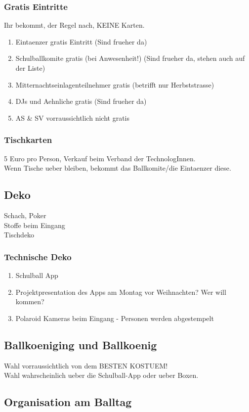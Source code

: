 \documentclass[12pt]{article}
\begin{document}
\subsubsection{Gratis Eintritte}
Ihr bekommt, der Regel nach, KEINE Karten.
\begin{enumerate}
\item Eintaenzer gratis Eintritt (Sind frueher da)
\item Schulballkomite gratis (bei Anwesenheit!) (Sind frueher da, stehen auch auf der Liste)
\item Mitternachtseinlagenteilnehmer gratis (betrifft nur Herbststrasse)
\item DJs und Aehnliche gratis (Sind frueher da)
\item AS \& SV vorraussichtlich nicht gratis 
\end{enumerate}
\subsubsection{Tischkarten}
5 Euro pro Person, Verkauf beim Verband der TechnologInnen. \\
Wenn Tische ueber bleiben, bekommt das Ballkomite/die Eintaenzer diese.

\subsection{Deko}
Schach, Poker \\
Stoffe beim Eingang \\
Tischdeko \\
\subsubsection{Technische Deko}
\begin{enumerate}
\item Schulball App
\item Projektpresentation des Apps am Montag vor Weihnachten? Wer will kommen?
\item Polaroid Kameras beim Eingang - Personen werden abgestempelt
\end{enumerate}
\subsection{Ballkoeniging und Ballkoenig}
Wahl vorraussichtlich von dem BESTEN KOSTUEM!
\\
Wahl wahrscheinlich ueber die Schulball-App oder ueber Boxen.
\newpage
\subsection{Organisation am Balltag}
\end{document}
